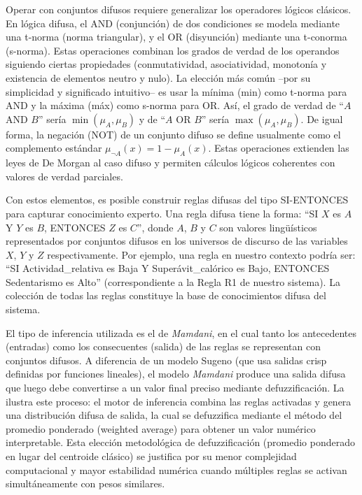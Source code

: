 Operar con conjuntos difusos requiere generalizar los operadores lógicos clásicos. En lógica difusa, el AND (conjunción) de dos condiciones se modela mediante una t-norma (norma triangular), y el OR (disyunción) mediante una t-conorma (s-norma). Estas operaciones combinan los grados de verdad de los operandos siguiendo ciertas propiedades (conmutatividad, asociatividad, monotonía y existencia de elementos neutro y nulo). La elección más común --por su simplicidad y significado intuitivo-- es usar la mínima (min) como t-norma para AND y la máxima (máx) como s-norma para OR. Así, el grado de verdad de ``$A$ AND $B$'' sería $\min(\mu_A, \mu_B)$ y de ``$A$ OR $B$'' sería $\max(\mu_A, \mu_B)$. De igual forma, la negación (NOT) de un conjunto difuso se define usualmente como el complemento estándar $\mu_{\neg A}(x) = 1 - \mu_A(x)$. Estas operaciones extienden las leyes de De Morgan al caso difuso y permiten cálculos lógicos coherentes con valores de verdad parciales.

Con estos elementos, es posible construir reglas difusas del tipo SI-ENTONCES para capturar conocimiento experto. Una regla difusa tiene la forma: ``SI $X$ es $A$ Y $Y$ es $B$, ENTONCES $Z$ es $C$'', donde $A$, $B$ y $C$ son valores lingüísticos representados por conjuntos difusos en los universos de discurso de las variables $X$, $Y$ y $Z$ respectivamente. Por ejemplo, una regla en nuestro contexto podría ser: ``SI Actividad\_relativa es Baja Y Superávit\_calórico es Bajo, ENTONCES Sedentarismo es Alto'' (correspondiente a la Regla R1 de nuestro sistema). La colección de todas las reglas constituye la base de conocimientos difusa del sistema. 

El tipo de inferencia utilizada es el de \textit{Mamdani}, en el cual tanto los antecedentes (entradas) como los consecuentes (salida) de las reglas se representan con conjuntos difusos. A diferencia de un modelo Sugeno (que usa salidas crisp definidas por funciones lineales), el modelo \textit{Mamdani} produce una salida difusa que luego debe convertirse a un valor final preciso mediante defuzzificación. La  ilustra este proceso: el motor de inferencia combina las reglas activadas y genera una distribución difusa de salida, la cual se defuzzifica mediante el método del promedio ponderado (weighted average) para obtener un valor numérico interpretable. Esta elección metodológica de defuzzificación (promedio ponderado en lugar del centroide clásico) se justifica por su menor complejidad computacional y mayor estabilidad numérica cuando múltiples reglas se activan simultáneamente con pesos similares.

